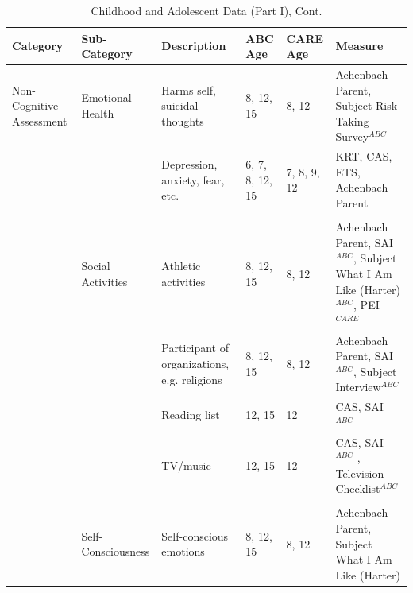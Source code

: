 \documentclass[static]{JJH-Beamer}
\begin{document}
\begin{frame}

\begin{table}[H]
\addtocounter{table}{-1}
\caption{Childhood and Adolescent Data (Part I), Cont.}
\begin{center}
\begin{tiny}
\begin{tabular}{L{1.2cm} C{1.4cm} C{2.3cm} C{1cm} C{1cm} C{2.7cm}}
\toprule
\textbf{Category}	&	\textbf{Sub-Category}	&	\textbf{Description}	&	\textbf{ABC Age}  	&  \textbf{CARE Age}  & 	\textbf{Measure}	\\ \midrule
Non-Cognitive Assessment	&	Emotional Health	&	Harms self, suicidal thoughts	&	8, 12, 15	&	8, 12	 	&	Achenbach Parent,  Subject Risk Taking Survey$^{ABC}$		\\
	&		&	Depression, anxiety, fear, etc.	&	6, 7, 8, 12, 15	&	7, 8, 9, 12	&	KRT, CAS, ETS,  Achenbach Parent	\\
	&	\\
	&	Social Activities	&	Athletic activities	&	8, 12, 15	&	8, 12		&	Achenbach Parent, SAI$^{ABC}$, Subject What I Am Like (Harter)$^{ABC}$, PEI$^{CARE}$	\\
	&		&	Participant of organizations, e.g. religions	&	8, 12, 15	&	8, 12	&	Achenbach Parent, SAI$^{ABC}$, Subject Interview$^{ABC}$	\\
	&		&	Reading list	&	12, 15	&	12	&	CAS, SAI$^{ABC}$	 \\
	&		&	TV/music	&	12, 15	&	12	&	CAS, SAI$^{ABC}$	, Television Checklist$^{ABC}$		\\
	&	\\
	&	Self-Consciousness	&	Self-conscious emotions	&	8, 12, 15	&	8, 12	&	Achenbach Parent, Subject What I Am Like (Harter)	\\ \bottomrule
\end{tabular}
\end{tiny}
\end{center}
\end{table}

\end{frame}
\end{document}
